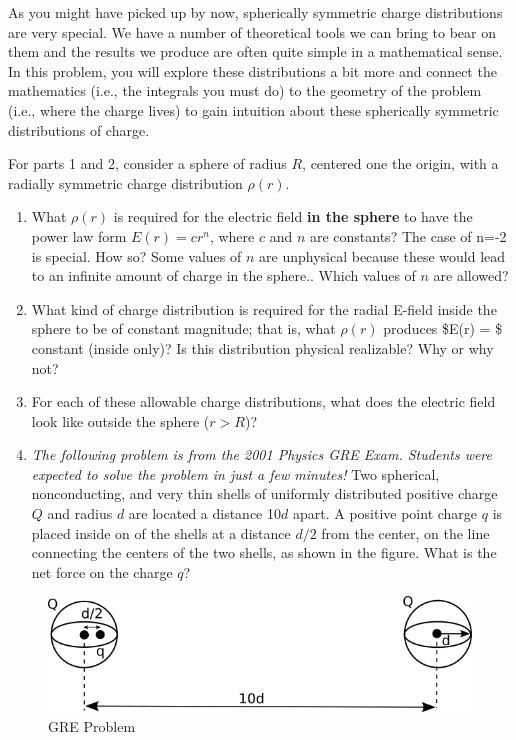 \documentclass[11pt]{article}
\def\tightlist{}
\begin{document}
As you might have picked up by now, spherically symmetric charge
distributions are very special. We have a number of theoretical tools we
can bring to bear on them and the results we produce are often quite
simple in a mathematical sense. In this problem, you will explore these
distributions a bit more and connect the mathematics (i.e., the
integrals you must do) to the geometry of the problem (i.e., where the
charge lives) to gain intuition about these spherically symmetric
distributions of charge.

For parts 1 and 2, consider a sphere of radius \(R\), centered one the
origin, with a radially symmetric charge distribution \(\rho(r)\).

\begin{enumerate}
\def\labelenumi{\arabic{enumi}.}
\tightlist
\item
  What \(\rho(r)\) is required for the electric field \textbf{in the
  sphere} to have the power law form \(E(r) = cr^n\), where \(c\) and
  \(n\) are constants? The case of n=-2 is special. How so? Some values
  of \(n\) are unphysical because these would lead to an infinite amount
  of charge in the sphere.. Which values of \(n\) are allowed?
\item
  What kind of charge distribution is required for the radial E-field
  inside the sphere to be of constant magnitude; that is, what
  \(\rho(r)\) produces \$E(r) = \$ constant (inside only)? Is this
  distribution physical realizable? Why or why not?
\item
  For each of these allowable charge distributions, what does the
  electric field look like outside the sphere (\(r>R\))?
\item
  \emph{The following problem is from the 2001 Physics GRE Exam.
  Students were expected to solve the problem in just a few minutes!}
  Two spherical, nonconducting, and very thin shells of uniformly
  distributed positive charge \(Q\) and radius \(d\) are located a
  distance 10\(d\) apart. A positive point charge \(q\) is placed inside
  on of the shells at a distance \(d/2\) from the center, on the line
  connecting the centers of the two shells, as shown in the figure. What
  is the net force on the charge \(q\)?
\end{enumerate}

\begin{figure}[htbp]
\centering
\includegraphics{./images/hw3/gre_problem.png}
\caption{GRE Problem}
\end{figure}
\end{document}
